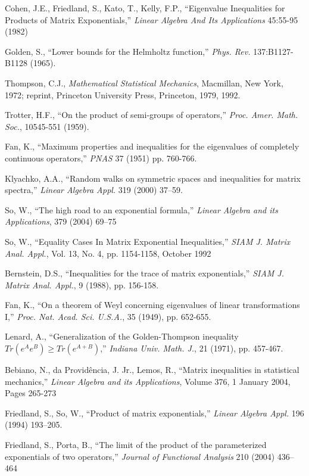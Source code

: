 \documentclass{svmult}
\begin{document}
\begin{thebibliography}{99}
Cohen, J.E., Friedland, S., Kato, T., Kelly, F.P.,
``Eigenvalue Inequalities for Products of Matrix Exponentials,''
{\it Linear Algebra And Its Applications} 45:55-95 (1982)

Golden, S., ``Lower bounds for the Helmholtz function,'' {\it Phys. Rev.}  137:B1127-B1128 (1965).

Thompson, C.J., {\it Mathematical Statistical Mechanics}, Macmillan, New York, 1972; reprint, Princeton University Press, Princeton, 1979, 1992.

Trotter, H.F., ``On the product of semi-groups of operators,''
 {\it Proc. Amer. Math. Soc.}, 10545-551 (1959).

Fan, K., ``Maximum properties and inequalities for the eigenvalues
of completely continuous operators,'' {\it PNAS} 37 (1951) pp. 760-766.

Klyachko, A.A., ``Random walks on symmetric spaces and inequalities for matrix spectra,'' {\it Linear Algebra Appl.} 319 (2000) 37–59.

So, W., ``The high road to an exponential formula,''
{\it Linear Algebra and its Applications}, 379 (2004) 69–75

So, W., ``Equality Cases In Matrix Exponential Inequalities,''
{\it SIAM J. Matrix Anal. Appl.},
Vol. 13, No. 4, pp. 1154-1158, October 1992

Bernstein, D.S., ``Inequalities for the trace of matrix exponentials,''  {\it SIAM J. Matrix Anal. Appl.}, 9 (1988),
pp. 156-158.

Fan, K., ``On a theorem of Weyl concerning eigenvalues of linear transformations I,'' {\it  Proc. Nat. Acad. Sci.
U.S.A.}, 35 (1949), pp. 652-655.

Lenard, A., ``Generalization of the Golden-Thompson inequality $Tr (e^A e^B) \geq Tr (e^{A+B})$,'' {\it Indiana Univ. Math. J.}, 21 (1971), pp. 457-467.

Bebiano, N.,  da Provid\^{e}ncia, J. Jr.,  Lemos, R.,
``Matrix inequalities in statistical mechanics,''
{\it Linear Algebra and its Applications},
Volume 376, 1 January 2004, Pages 265-273

Friedland, S., So, W., ``Product of matrix exponentials,''
 {\it Linear Algebra Appl.} 196 (1994) 193–205.

Friedland, S., Porta, B.,
``The limit of the product of the parameterized
exponentials of two operators,''
{\it Journal of Functional Analysis} 210 (2004) 436–464


\end{thebibliography}
\end{document}
